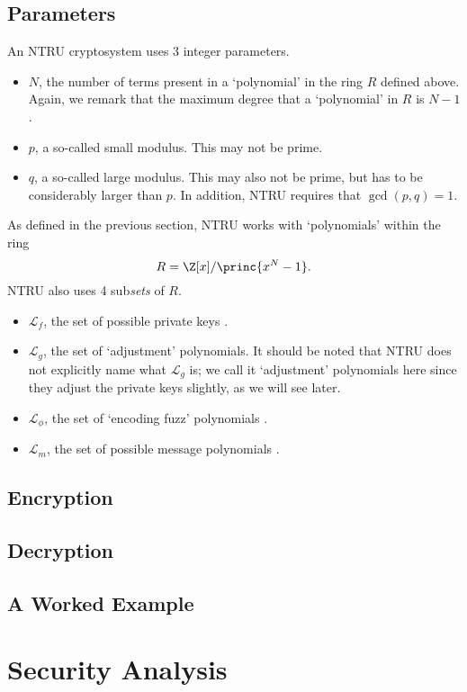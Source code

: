 \subsection{Parameters}
An NTRU cryptosystem uses 3 integer parameters.
\begin{itemize}
    \item $N$, the number of terms present in a `polynomial' in the ring $R$ defined above. Again, we remark that the maximum degree that a `polynomial' in $R$ is $N - 1$.
    \item $p$, a so-called small modulus. This may not be prime.
    \item $q$, a so-called large modulus. This may also not be prime, but has to be considerably larger than $p$. In addition, NTRU requires that $\gcd(p,q) = 1$.
\end{itemize}

As defined in the previous section, NTRU works with `polynomials' within the ring
\[
    R = \Z[x] / \princ{x^N - 1}.
\]
NTRU also uses 4 sub\textit{sets} of $R$.
\begin{itemize}
    \item $\mathcal{L}_f$, the set of possible private keys \cite[\S 1.2]{hoffstein_pipher_silverman_1998}.
    \item $\mathcal{L}_g$, the set of `adjustment' polynomials. It should be noted that NTRU does not explicitly name what $\mathcal{L}_g$ is; we call it `adjustment' polynomials here since they adjust the private keys slightly, as we will see later.
    \item $\mathcal{L}_\phi$, the set of `encoding fuzz' polynomials \cite[\S 1.3]{hoffstein_pipher_silverman_1996}.
    \item $\mathcal{L}_m$, the set of possible message polynomials \cite[\S 1.3]{hoffstein_pipher_silverman_1998}.
\end{itemize}

\subsection{Encryption}

\subsection{Decryption}

\subsection{A Worked Example}

\section{Security Analysis}
